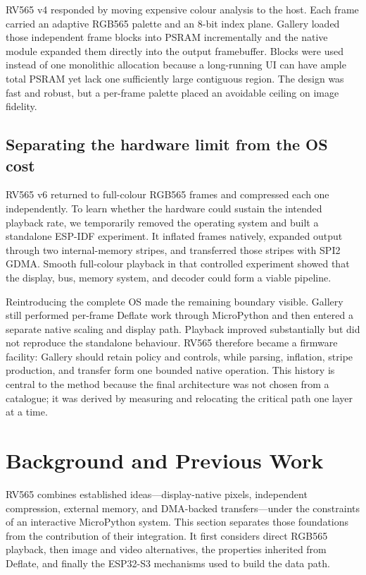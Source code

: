 \documentclass[11pt,twocolumn]{article}
\begin{document}
RV565 v4 responded by moving expensive colour analysis to the host.  Each
frame carried an adaptive RGB565 palette and an 8-bit index plane.  Gallery
loaded those independent frame blocks into PSRAM incrementally and the native
module expanded them directly into the output framebuffer.  Blocks were used
instead of one monolithic allocation because a long-running UI can have ample
total PSRAM yet lack one sufficiently large contiguous region.  The design was
fast and robust, but a per-frame palette placed an avoidable ceiling on image
fidelity.

\subsection{Separating the hardware limit from the OS cost}

RV565 v6 returned to full-colour RGB565 frames and compressed each one
independently.  To learn whether the hardware could sustain the intended
playback rate, we temporarily removed the operating system and built a
standalone ESP-IDF experiment.  It inflated frames natively, expanded output
through two internal-memory stripes, and transferred those stripes with SPI2
GDMA.  Smooth full-colour playback in that controlled experiment showed that
the display, bus, memory system, and decoder could form a viable pipeline.

Reintroducing the complete OS made the remaining boundary visible.  Gallery
still performed per-frame Deflate work through MicroPython and then entered a
separate native scaling and display path.  Playback improved substantially but
did not reproduce the standalone behaviour.  RV565 therefore became a
firmware facility: Gallery should retain policy and controls, while parsing,
inflation, stripe production, and transfer form one bounded native operation.
This history is central to the method because the final architecture was not
chosen from a catalogue; it was derived by measuring and relocating the
critical path one layer at a time.

\section{Background and Previous Work}

RV565 combines established ideas---display-native pixels, independent
compression, external memory, and DMA-backed transfers---under the constraints
of an interactive MicroPython system.  This section separates those foundations
from the contribution of their integration.  It first considers direct RGB565
playback, then image and video alternatives, the properties inherited from
Deflate, and finally the ESP32-S3 mechanisms used to build the data path.
\end{document}

